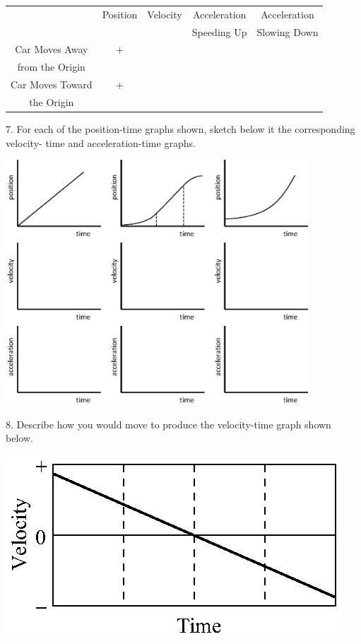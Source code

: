\vspace{0.3cm}
{\centering \begin{tabular}{|c|c|c|c|c|}
\hline 
&
Position&
Velocity&
Acceleration&
Acceleration\\
&
&
&
Speeding Up&
Slowing Down\\
\hline 
Car Moves Away&
+&
&
&
\\
from the Origin&
&
&
&
\\
\hline 
Car Moves Toward&
+&
&
&
\\
the Origin&
&
&
&
\\
\hline 
\end{tabular}\par}
\vspace{0.3cm}

\newpage

7. For each of the position-time graphs shown, sketch below it the corresponding
velocity- time and acceleration-time graphs.

{\par\centering \includegraphics[width=0.85\textwidth]{slowing/slowing_fig11_new.eps} \par}

8. Describe how you would move to produce the velocity-time graph shown below.

\vspace{0.3cm}
{\par\raggedright \includegraphics{slowing/slowing_fig12.eps} \par}
\vspace{0.3cm}

